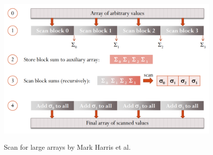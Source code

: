 \documentclass[Ingles]{ic-tese-v1}
\begin{document}
\begin{figure}[t]
	\centering
	\caption{Scan for large arrays by Mark Harris et al.}
	\includegraphics[scale=0.4]{images/largescan.png}
	\label{fig:largescan}
\end{figure}
\end{document}
